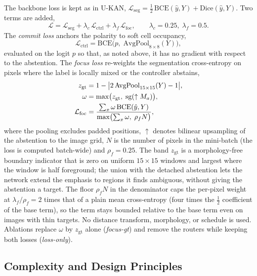 The backbone loss is kept as in U-KAN, $\mathcal{L}_{\mathrm{seg}}=\tfrac12\,\mathrm{BCE}(\hat y,Y)+\mathrm{Dice}(\hat y,Y)$. Two terms are added,
\begin{equation}
\mathcal{L}=\mathcal{L}_{\mathrm{seg}}+\lambda_c\,\mathcal{L}_{\mathrm{ctrl}}+\lambda_f\,\mathcal{L}_{\mathrm{foc}},\qquad \lambda_c=0.25,\;\lambda_f=0.5 .
\label{eq:total}
\end{equation}
The \emph{commit loss} anchors the polarity to soft cell occupancy,
\begin{equation}
\mathcal{L}_{\mathrm{ctrl}}=\mathrm{BCE}\bigl(p,\;\mathrm{AvgPool}_{8\times8}(Y)\bigr),
\label{eq:lctrl}
\end{equation}
evaluated on the logit $p$ so that, as noted above, it has no gradient with respect to the abstention. The \emph{focus loss} re-weights the segmentation cross-entropy on pixels where the label is locally mixed or the controller abstains,
\begin{align}
z_{\mathrm{gt}}&=1-\bigl\lvert 2\,\mathrm{AvgPool}_{15\times15}(Y)-1\bigr\rvert,\notag\\
\omega&=\max\bigl(z_{\mathrm{gt}},\;\mathrm{sg}(\uparrow M_a)\bigr),\notag\\
\mathcal{L}_{\mathrm{foc}}&=\frac{\sum_x \omega\,\mathrm{BCE}(\hat y,Y)}{\max\bigl(\sum_x\omega,\;\rho_f N\bigr)},
\label{eq:lfoc}
\end{align}
where the pooling excludes padded positions, $\uparrow$ denotes bilinear upsampling of the abstention to the image grid, $N$ is the number of pixels in the mini-batch (the loss is computed batch-wide) and $\rho_f=0.25$. The band $z_{\mathrm{gt}}$ is a morphology-free boundary indicator that is zero on uniform $15\times15$ windows and largest where the window is half foreground; the union with the detached abstention lets the network extend the emphasis to regions it finds ambiguous, without giving the abstention a target. The floor $\rho_f N$ in the denominator caps the per-pixel weight at $\lambda_f/\rho_f=2$ times that of a plain mean cross-entropy (four times the $\tfrac12$ coefficient of the base term), so the term stays bounded relative to the base term even on images with thin targets. No distance transform, morphology, or schedule is used. Ablations replace $\omega$ by $z_{\mathrm{gt}}$ alone (\emph{focus-gt}) and remove the routers while keeping both losses (\emph{loss-only}).

\subsection{Complexity and Design Principles}
\label{sec:complexity}

